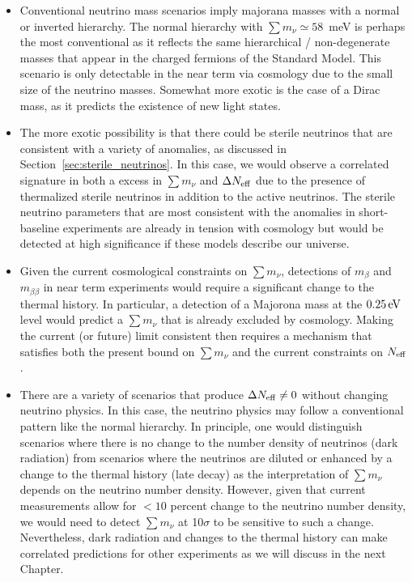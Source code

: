\begin{itemize}
\item Conventional neutrino mass scenarios imply majorana masses with a normal or inverted hierarchy.  The normal hierarchy with $\sum m_\nu \simeq 58$~meV is perhaps the most conventional as it reflects the same hierarchical / non-degenerate masses that appear in the charged fermions of the Standard Model.  This scenario is only detectable in the near term via cosmology due to the small size of the neutrino masses.  Somewhat more exotic is the case of a Dirac mass, as it predicts the existence of new light states.

\item The more exotic possibility is that there could be sterile neutrinos that are consistent with a variety of anomalies, as discussed in Section~\ref{sec:sterile_neutrinos}.  In this case, we would observe a correlated signature in both a excess in $\sum m_\nu$ and $\Delta N_{\rm eff}$ due to the presence of thermalized sterile neutrinos in addition to the active neutrinos.  The sterile neutrino parameters that are most consistent with the anomalies in short-baseline experiments are already in tension with cosmology but would be detected at high significance if these models describe our universe.  

\item Given the current cosmological constraints on $\sum m_\nu$, detections of $m_\beta$ and $m_{\beta \beta}$ in near term experiments would require a significant change to the thermal history.  In particular, a detection of a Majorona mass at the $0.25 \, {\rm eV}$ level would predict a $\sum m_\nu$ that is already excluded by cosmology.  Making the current (or future) limit consistent then requires a mechanism that satisfies both the present bound on $\sum m_\nu$ and the current constraints on $N_{\rm eff}$.


\item There are a variety of scenarios that produce $\Delta N_{\rm eff}  \neq 0$ without changing neutrino physics.  In this case, the neutrino physics may follow a conventional pattern like the normal hierarchy.  In principle, one would distinguish scenarios where there is no change to the number density of neutrinos (dark radiation) from scenarios where the neutrinos are diluted or enhanced by a change to the thermal history (late decay) as the interpretation of $\sum m_\nu$ depends on the neutrino number density.  However, given that current measurements allow for $< 10$ percent change to the neutrino number density, we would need to detect $\sum m_\nu$ at 10$\sigma$ to be sensitive to such a change.  Nevertheless, dark radiation and changes to the thermal history can make correlated predictions for other experiments as we will discuss in the next Chapter.


\end{itemize}
